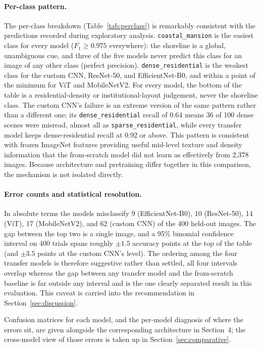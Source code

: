 \documentclass[11pt,twoside,a4paper]{article}
\begin{document}
\paragraph{Per-class pattern.}
The per-class breakdown (Table~\ref{tab:perclass}) is remarkably consistent
with the predictions recorded during exploratory analysis.
\texttt{coastal\_mansion} is the easiest class for every model ($F_1 \geq
0.975$ everywhere): the shoreline is a global, unambiguous cue, and three of
the five models never predict this class for an image of any other class
(perfect precision). \texttt{dense\_residential} is the weakest class for the
custom CNN, ResNet-50, and EfficientNet-B0, and within a point of the
minimum for ViT and MobileNetV2. For every model, the bottom of the table
is a residential-density or institutional-layout judgement, never the
shoreline class. The custom CNN's failure is an extreme version of the same
pattern rather than a different one; its \texttt{dense\_residential} recall of 0.64 means 36 of
100 dense scenes were misread, almost all as \texttt{sparse\_residential},
while every transfer model keeps dense-residential recall at 0.92 or above.
This pattern is consistent with frozen ImageNet features providing useful
mid-level texture and density information that the from-scratch model did not
learn as effectively from 2,378 images. Because architecture and pretraining
differ together in this comparison, the mechanism is not isolated directly.

\paragraph{Error counts and statistical resolution.}
In absolute terms the models misclassify 9 (EfficientNet-B0), 10 (ResNet-50),
14 (ViT), 17 (MobileNetV2), and 62 (custom CNN) of the 400 held-out images.
The gap between the top two is a single image, and a 95\% binomial confidence
interval on 400 trials spans roughly $\pm 1.5$ accuracy points at the top of
the table (and $\pm 3.5$ points at the custom CNN's level). The ordering
among the four transfer models is therefore suggestive rather than settled, all four intervals overlap whereas the gap between any transfer model
and the from-scratch baseline is far outside any interval and is the one
clearly separated result in this evaluation. This caveat
is carried into the recommendation in Section~\ref{sec:discussion}.

Confusion matrices for each model, and the per-model diagnosis of where the
errors sit, are given alongside the corresponding architecture in
Section~4; the cross-model view of those errors is taken up in
Section~\ref{sec:comparative}.
\end{document}
